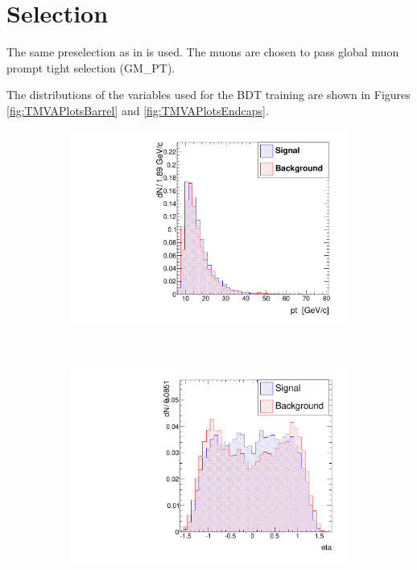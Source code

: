 \documentclass[10pt,a4paper]{article}
\begin{document}
\section{Selection}

The same preselection as in \cite{MainAN} is used. The muons are chosen to pass global muon prompt tight
selection (GM\_PT).

The distributions of the variables used for the BDT training are shown in Figures \ref{fig:TMVAPlotsBarrel} and \ref{fig:TMVAPlotsEndcaps}.

\begin{figure}
        \centering
        \begin{subfigure}[b]{0.2\textwidth}
                \centering
                \includegraphics[width=\textwidth]{Figures/pt_barrel}
                \label{fig:ptBarrel}
        \end{subfigure}
        ~
        \begin{subfigure}[b]{0.2\textwidth}
                \centering
                \includegraphics[width=\textwidth]{Figures/eta_barrel}

\end{subfigure}
\end{figure}
\end{document}
